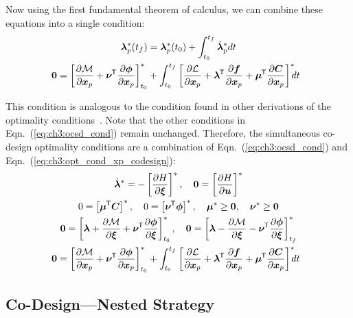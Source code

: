 \noindent Now using the first fundamental theorem of calculus, we can combine these equations into a single condition:
\begin{subequations}
\begin{gather}
\blambda^*_p(t_f) = \blambda^*_p(t_0) + \int_{t_0}^{t_f} \dot{\blambda}^*_p dt \\
\hspace*{-0.08in} \bzero = \left[ \pd{\mayer}{\bxp} + \bnu\tran \pd{\bm{\phi}}{\bxp} \right]_{t_0}^* + \int_{t_0}^{t_f} \left[ \pd{\lagrange}{\bxp}  + \blambda\tran \pd{\bfd}{\bxp} + \bmu\tran \pd{\bm{C}}{\bxp} \right]^* \hspace*{-0.07in} dt \label{eq:ch3:opt_cond_xp_codesign}
\end{gather}
\end{subequations}

\noindent This condition is analogous to the condition found in other derivations of the optimality conditions~\cite{Fathy2001a, Dolezal1981a}.
Note that the other conditions in Eqn.~(\ref{eq:ch3:ocsd_cond}) remain unchanged.
Therefore, the simultaneous co-design optimality conditions are a combination of Eqn.~(\ref{eq:ch3:ocsd_cond}) and Eqn.~(\ref{eq:ch3:opt_cond_xp_codesign}):
\begingroup
\allowdisplaybreaks
\begin{subequations}
\label{eq:ch3:opt_cond_sim}
\begin{gather}
\dot{\blambda}^* = - \left[ \pd{H}{\bxi} \right]^*, \quad 
\bzero = \left[ \pd{H}{\bu} \right]^* \\
0 = \left[ \bmu\tran \bm{C}\right]^*, \quad 0 = \left[ \bnu\tran \bm{\phi} \right]^*, \quad \bmu^* \geq \bzero, \quad \bnu^* \geq \bzero \\
\bzero = \left[ \blambda + \pd{\mayer}{\bxi} + \bnu\tran \pd{\bm{\phi}}{\bxi} \right]_{t_0}^*, \quad
\bzero = \left[ \blambda - \pd{\mayer}{\bxi} - \bnu\tran \pd{\bm{\phi}}{\bxi} \right]_{t_f}^* \\
\hspace*{-0.08in} \bzero = \left[ \pd{\mayer}{\bxp} + \bnu\tran \pd{\bm{\phi}}{\bxp} \right]_{t_0}^* + \int_{t_0}^{t_f} \left[ \pd{\lagrange}{\bxp}  + \blambda\tran \pd{\bfd}{\bxp} + \bmu\tran \pd{\bm{C}}{\bxp} \right]^* \hspace*{-0.07in}  dt
\end{gather}
\end{subequations}
\endgroup

\subsection{Co-Design---Nested Strategy}

